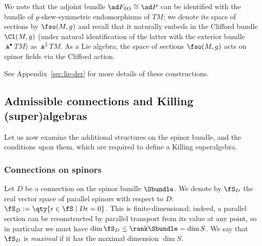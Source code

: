 We note that the adjoint bundle $\ad F_{\rm SO}\cong\ad P$ can be identified with the bundle of $g$-skew-symmetric endomorphisms of $TM$; we denote its space of sections by $\fso(M,g)$ and recall that it naturally embeds in the Clifford bundle $\Cl(M,g)$ (under natural identification of the latter with the exterior bundle $\Wedge^\bullet TM$) as $\Wedge^2 TM$. As a Lie algebra, the space of sections $\fso(M,g)$ acts on spinor fields via the Clifford action.

See Appendix~\ref{sec:lie-der} for more details of these constructions.

\subsection{Admissible connections and Killing (super)algebras}
\label{sec:admissible-ksa}

Let us now examine the additional structures on the spinor bundle, and the conditions upon them, which are required to define a Killing superalgebra.

\subsubsection{Connections on spinors}

Let $D$ be a connection on the spinor bundle $\Sbundle$. We denote by $\fS_D$ the real vector space of parallel spinors with respect to $D$:
$\fS_D := \qty{\epsilon\in\fS\mid D\epsilon = 0}$.
This is finite-dimensional; indeed, a parallel section can be reconstructed by parallel transport from its value at any point, so in particular we must have $\dim\fS_D\leq\rank\Sbundle=\dim S$. We say that $\fS_D$ is \emph{maximal} if it has the maximal dimension $\dim S$.

